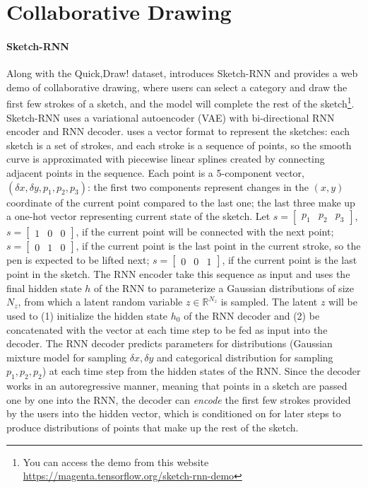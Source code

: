 \section{Collaborative Drawing}

\paragraph{Sketch-RNN}
Along with the Quick,Draw! dataset, \cite{ha2017neural} introduces Sketch-RNN and provides a web demo of collaborative drawing, where users can select a category and draw the first few strokes of a sketch, and the model will complete the rest of the sketch\footnote{You can access the demo from this website \url{https://magenta.tensorflow.org/sketch-rnn-demo}}. Sketch-RNN uses a variational autoencoder (VAE) with bi-directional RNN encoder and RNN decoder. 
\cite{ha2017neural} uses a vector format to represent the sketches: each sketch is a set of strokes, and each stroke is a sequence of points, so the smooth curve is approximated with piecewise linear splines created by connecting adjacent points in the sequence. Each point is a 5-component vector, $(\delta x, \delta y, p_1, p_2, p_3)$: the first two components represent changes in the $(x,y)$ coordinate of the current point compared to the last one; the last three make up a one-hot vector representing current state of the sketch. Let $s = \begin{bmatrix}p_1 & p_2 & p_3\end{bmatrix}$,
$ s = \begin{bmatrix}1 & 0 & 0\end{bmatrix}$, if the current point will be connected with the next point;
$s = \begin{bmatrix}0 & 1 & 0\end{bmatrix}$, if the current point is the last point in the current stroke, so the pen is expected to be lifted next;
$s = \begin{bmatrix}0 & 0 & 1\end{bmatrix}$, if the current point is the last point in the sketch.     
The RNN encoder take this sequence as input and uses the final hidden state $h$ of the RNN to parameterize a Gaussian distributions of size $N_z$, from which a latent random variable $z \in \mathbb{R}^{N_z}$ is sampled. The latent $z$ will be used to (1) initialize the hidden state $h_0$ of the RNN decoder and (2) be concatenated with the vector at each time step to be fed as input into the decoder.  
The RNN decoder predicts parameters for distributions (Gaussian mixture model for sampling $\delta x, \delta y$ and categorical distribution for sampling $p_1,p_2,p_2$) at each time step from the hidden states of the RNN. Since the decoder works in an autoregressive manner, meaning that points in a sketch are passed one by one into the RNN, the decoder can \textit{encode} the first few strokes provided by the users into the hidden vector, which is conditioned on for later steps to produce distributions of points that make up the rest of the sketch. 
